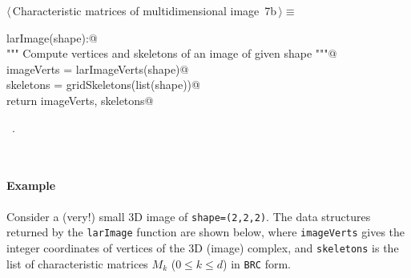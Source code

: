\documentclass[11pt,oneside]{article}	%
\begin{document}
\begin{flushleft} \small
\begin{minipage}{\linewidth} \label{scrap11}
\protect{}$\langle\,$Characteristic matrices of multidimensional image\nobreak\ {\footnotesize 7b}$\,\rangle\equiv$
\vspace{-1ex}
\begin{list}{}{} \item
\mbox{}\verb@def larImage(shape):@\\
\mbox{}\verb@   """ Compute vertices and skeletons of an image of given shape """@\\
\mbox{}\verb@   imageVerts = larImageVerts(shape)@\\
\mbox{}\verb@   skeletons = gridSkeletons(list(shape))@\\
\mbox{}\verb@   return imageVerts, skeletons@\\
\mbox{}\verb@@{\NWsep}
\end{list}
\vspace{-1ex}
\footnotesize\addtolength{\baselineskip}{-1ex}
\begin{list}{}{\setlength{\itemsep}{-\parsep}\setlength{\itemindent}{-\leftmargin}}
\item \NWtxtMacroRefIn\ .
\end{list}
\end{minipage}\\[4ex]
\end{flushleft}

\paragraph{Example}
Consider a (very!) small 3D image of \texttt{shape=(2,2,2)}. The data structures returned by the \texttt{larImage} function are shown below, where \texttt{imageVerts} gives the integer coordinates of vertices of the 3D (image) complex, and \texttt{skeletons} is the list of characteristic matrices $M_k$ ($0\leq k\leq d$) in \texttt{BRC} form.
\end{document}
